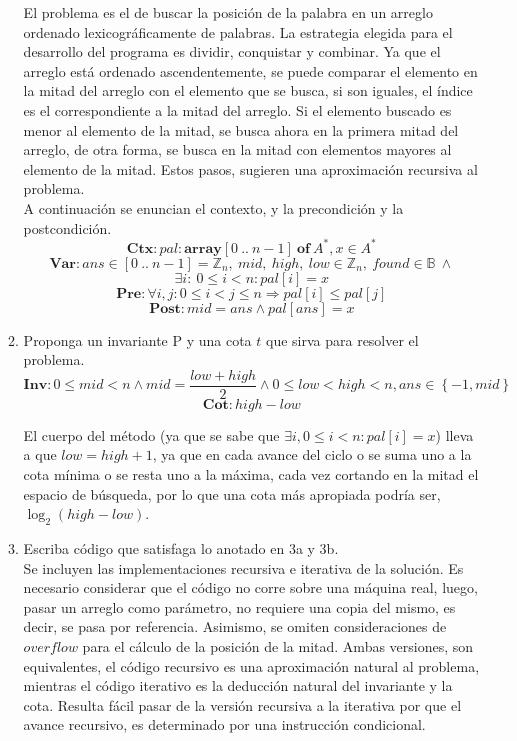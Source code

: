 \documentclass[11pt,spanish]{article}
\begin{document}
\begin{enumerate}
\begin{enumerate}
		El problema es el de buscar la posición de la palabra en un arreglo ordenado lexicográficamente de palabras. La estrategia elegida para el desarrollo del programa es dividir, conquistar y combinar. Ya que el arreglo está ordenado ascendentemente, se puede comparar el elemento en la mitad del arreglo con el elemento que se busca, si son iguales, el índice es el correspondiente a la mitad del arreglo. Si el elemento buscado es menor al elemento de la mitad, se busca ahora en la primera mitad del arreglo, de otra forma, se busca en la mitad con elementos mayores al elemento de la mitad. Estos pasos, sugieren una aproximación recursiva al problema. \\
		A continuación se enuncian el contexto, y la precondición y la postcondición.		
		$$\textbf{Ctx} : pal : \textbf{array}[0\ ..\ n - 1]\ \textbf{of}\ A^*, x \in A^*$$
		$$\textbf{Var} : ans \in [0\ ..\ n - 1] = \mathbb{Z}_{n},\ mid,\ high,\ low \in \mathbb{Z}_{n},\ found \in \mathbb{B}\ \wedge$$ $$ \exists i : \ 0 \leq i < n : pal[i] = x$$
		$$\textbf{Pre} : \forall i, j : 0 \leq i < j \leq n \Rightarrow pal[i] \leq pal[j]$$
		$$\textbf{Post} : mid = ans \wedge pal[ans] = x$$
		 
		\item Proponga un invariante P y una cota $t$ que sirva para resolver el problema. \\		
		$$\textbf{Inv} : 0 \leq mid < n \wedge mid = \frac{low + high}{2} \wedge 0 \leq low < high < n, ans \in \left\{ -1, mid\right\}$$
		$$\textbf{Cot} : high - low$$	
		
		El cuerpo del método (ya que se sabe que $\exists i, 0 \leq i < n : pal[i] = x$) lleva a que $low = high + 1$, ya que en cada avance del ciclo o se suma uno a la cota mínima o se resta uno a la máxima, cada vez cortando en la mitad el espacio de búsqueda, por lo que una cota más apropiada podría ser, $\log_{2}(high - low)$.
		
		\pagebreak 
		
		
		\item Escriba código que satisfaga lo anotado en 3a y 3b. \\
		
		Se incluyen las implementaciones recursiva e iterativa de la solución. Es necesario considerar que el código no corre sobre una máquina real, luego, pasar un arreglo como parámetro, no requiere una copia del mismo, es decir, se pasa por referencia. Asimismo, se omiten consideraciones de $overflow$ para el cálculo de la posición de la mitad. Ambas versiones, son equivalentes, el código recursivo es una aproximación natural al problema, mientras el código iterativo es la deducción natural del invariante y la cota. Resulta fácil pasar de la versión recursiva a la iterativa por que el avance recursivo, es determinado por una instrucción condicional.
		

\end{enumerate}
\end{enumerate}
\end{document}
